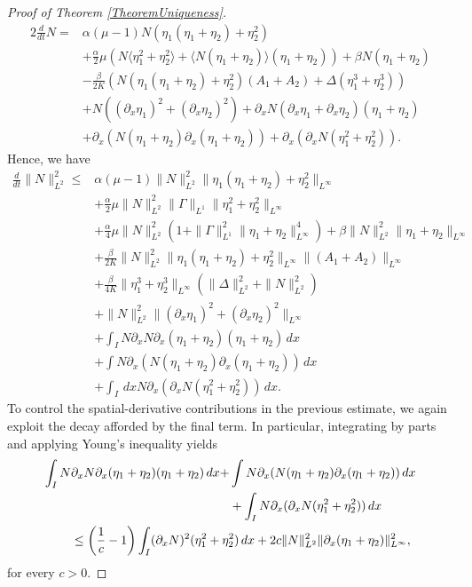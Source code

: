 \documentclass[12pt]{amsart}
\newcommand{\D}{\,d}
\begin{document}
\begin{proof}[Proof of Theorem \ref{TheoremUniqueness}]
\begin{equation*}
\begin{split}
			2\frac{d}{dt}N=&\alpha(\mu-1)N(\eta_1(\eta_1+\eta_2)+\eta_2^2)\\
            &+\frac{\alpha}{2}\mu(N\langle \eta_1^2+\eta_2^2 \rangle+\langle N(\eta_1+\eta_2) \rangle(\eta_1+\eta_2))+\beta N(\eta_1+\eta_2)\\
            &-\frac{\beta}{2K}(N(\eta_1(\eta_1+\eta_2)+\eta_2^2)(A_1+A_2)+\Delta(\eta_1^3+\eta_2^3))\\
			&+N((\partial_x \eta_1)^2+(\partial_x \eta_2)^2)+\partial_xN(\partial_x \eta_1+\partial_x \eta_2)(\eta_1+\eta_2)\\
			&+ \partial_x(N(\eta_1+\eta_2)\partial_x(\eta_1+\eta_2))+\partial_x(\partial_xN(\eta_1^2+\eta_2^2)).
		\end{split}
	\end{equation*}
	Hence, we have
	\begin{equation*}
		\begin{split}
			\frac{d}{dt}\|N\|_{L^2}^2\leq &\alpha(\mu-1)\|N\|_{L^2}^2\|\eta_1(\eta_1+\eta_2)+\eta_2^2\|_{L^\infty}\\
            &+\frac{\alpha}{2}\mu\|N\|_{L^2}^2\|\Gamma\|_{L^1}\|\eta_1^2+\eta_2^2\|_{L^\infty}\\
			&+\frac{\alpha}{4}\mu \|N\|_{L^2}^2(1+ \|\Gamma\|_{L^1}^2\|\eta_1+\eta_2\|_{L^\infty}^4)+\beta\|N\|_{L^2}^2\|\eta_1+\eta_2\|_{L^\infty}  \\
			&+\frac{\beta}{2K}\|N\|_{L^2}^2\|\eta_1(\eta_1+\eta_2)+\eta_2^2\|_{L^\infty}\|(A_1+A_2)\|_{L^\infty}\\
			&+\frac{\beta}{4K}\|\eta_1^3+\eta_2^3\|_{	L^\infty}(\|\Delta\|_{L^2}^2+\|N\|_{L^2}^2)\\
            &+\|N\|_{L^2}^2\|(\partial_x \eta_1)^2+(\partial_x \eta_2)^2\|_{L^\infty}\\
			&+\int_I N\partial_xN\partial_x(\eta_1+ \eta_2)(\eta_1+\eta_2)\D x\\
            &+\int N \partial_x(N(\eta_1+\eta_2)\partial_x(\eta_1+\eta_2))\D x\\
			&+\int_I \D x N\partial_x(\partial_xN(\eta_1^2+\eta_2^2)) \D x.
		\end{split}
	\end{equation*}
	To control the spatial-derivative contributions in the previous estimate, we again exploit the decay afforded by the final term. In particular, integrating by parts and applying Young’s inequality yields
    \begin{equation*}
		\begin{split}
			\int_I N\partial_xN\partial_x(\eta_1+ \eta_2)(\eta_1+\eta_2) \D x+&\int N \partial_x(N(\eta_1+\eta_2)\partial_x(\eta_1+\eta_2)) \D x
			\\
            &+\int_I N\partial_x(\partial_xN(\eta_1^2+\eta_2^2)) \D x\\
			&\hspace{-4.5cm}\leq
			\left(\frac{1}{c}-1\right)\int_I (\partial_xN)^2(\eta_1^2+\eta_2^2) \D x+2c\|N\|_{L^2}^2\|\partial_x(\eta_1+\eta_2)\|_{L^\infty}^2 ,
		\end{split}
	\end{equation*}
	for every $c>0$.
	

\end{proof}
\end{document}
